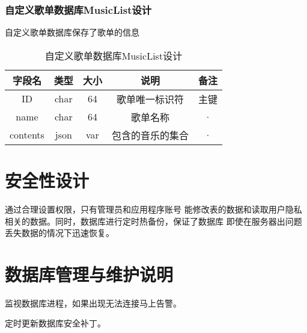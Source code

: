 \subsubsection{自定义歌单数据库MusicList设计}

自定义歌单数据库保存了歌单的信息

\begin{table}[htbp]
	\centering
	\caption{自定义歌单数据库MusicList设计} \label{tab:music-list-database}
	\begin{tabular}{|c|c|c|c|c|}
		\hline
		字段名 & 类型 & 大小 & 说明 & 备注 \\
		\hline
		ID & char & 64 & 歌单唯一标识符 & 主键\\
		\hline
		name & char & 64 & 歌单名称 & · \\
		\hline
		contents & json & var & 包含的音乐的集合  & · \\
		\hline
	\end{tabular}
\end{table}


\section{安全性设计}
通过合理设置权限，只有管理员和应用程序账号
能修改表的数据和读取用户隐私相关的数据。同时，数据库进行定时热备份，保证了数据库
即使在服务器出问题丢失数据的情况下迅速恢复。

\section{数据库管理与维护说明}
监视数据库进程，如果出现无法连接马上告警。

定时更新数据库安全补丁。